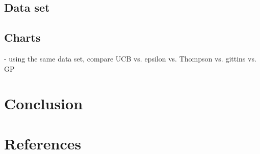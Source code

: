 \documentclass{article}
\begin{document}
\subsection{Data set}

\subsection{Charts}

- using the same data set, compare UCB vs. epsilon vs. Thompson vs. gittins vs. GP

\section{Conclusion}

\section{References}
\end{document}
